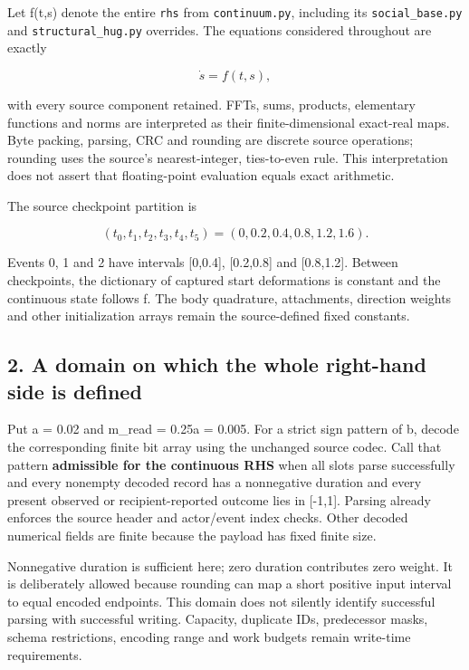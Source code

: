 \documentclass[11pt,a4paper]{article}
\begin{document}
Let f(t,s) denote the entire \texttt{rhs} from \texttt{continuum.py}, including its \texttt{social\_base.py} and \texttt{structural\_hug.py} overrides. The equations considered throughout are exactly



\[
\dot s=f(t,s),
\]



with every source component retained. FFTs, sums, products, elementary functions and norms are interpreted as their finite-dimensional exact-real maps. Byte packing, parsing, CRC and rounding are discrete source operations; rounding uses the source's nearest-integer, ties-to-even rule. This interpretation does not assert that floating-point evaluation equals exact arithmetic.

The source checkpoint partition is



\[
(t_0,t_1,t_2,t_3,t_4,t_5)=(0,0.2,0.4,0.8,1.2,1.6).
\]



Events 0, 1 and 2 have intervals [0,0.4], [0.2,0.8] and [0.8,1.2]. Between checkpoints, the dictionary of captured start deformations is constant and the continuous state follows f. The body quadrature, attachments, direction weights and other initialization arrays remain the source-defined fixed constants.

\subsection*{2. A domain on which the whole right-hand side is defined}

Put a = 0.02 and m\_read = 0.25a = 0.005. For a strict sign pattern of b, decode the corresponding finite bit array using the unchanged source codec. Call that pattern \textbf{admissible for the continuous RHS} when all slots parse successfully and every nonempty decoded record has a nonnegative duration and every present observed or recipient-reported outcome lies in [-1,1]. Parsing already enforces the source header and actor/event index checks. Other decoded numerical fields are finite because the payload has fixed finite size.

Nonnegative duration is sufficient here; zero duration contributes zero weight. It is deliberately allowed because rounding can map a short positive input interval to equal encoded endpoints. This domain does not silently identify successful parsing with successful writing. Capacity, duplicate IDs, predecessor masks, schema restrictions, encoding range and work budgets remain write-time requirements.
\end{document}
